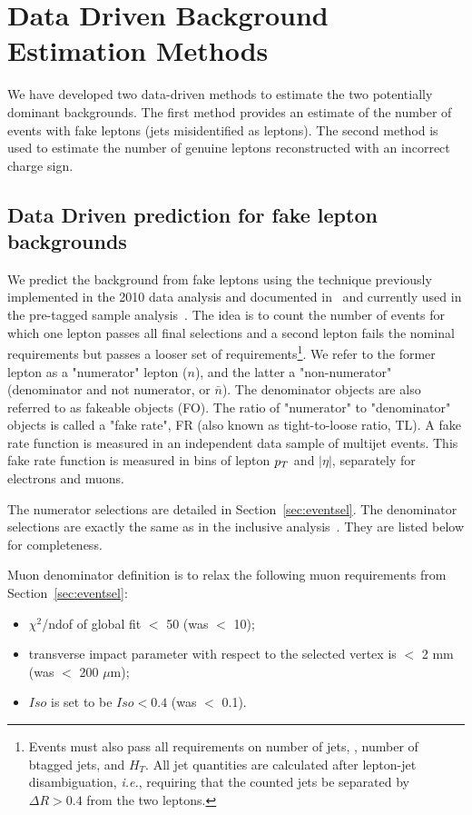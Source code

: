 \section{Data Driven Background Estimation Methods}
\label{sec:datadriven}

We have developed two data-driven methods to 
estimate the two potentially dominant backgrounds.
The first method provides an estimate of the number of events with fake leptons (jets misidentified as leptons).
The second method is used to estimate the number of genuine leptons reconstructed with an incorrect charge sign.

\subsection{Data Driven prediction for fake lepton backgrounds}
\label{sec:fakes}

We predict the background from fake leptons using the technique previously implemented in the 2010 data analysis
and documented in~\cite{frmethod} and currently used in the pre-tagged sample analysis~\cite{ssnote2011}.
The idea is to count the number of events for which one lepton passes all final selections and a second lepton
fails the nominal requirements but passes a looser set of requirements\footnote{Events must also
pass all requirements on number of jets, \met, number of btagged jets, and $H_T$.
All jet quantities are calculated after lepton-jet disambiguation, {\it i.e.}, requiring 
that the counted jets be separated by $\Delta R > 0.4$ from the two leptons.}. 
We refer to the former lepton as a "numerator" lepton ($n$),
and the latter a "non-numerator" (denominator and not numerator, or $\bar{n}$).
The denominator objects are also referred to as fakeable objects (FO).
The ratio of "numerator" to "denominator" objects is called a "fake rate",
 FR (also known as tight-to-loose ratio, TL).  
A fake rate function is measured in an independent data sample of multijet events.
This fake rate function is measured in bins of lepton $p_T$ and $|\eta |$,
separately for electrons and muons. 

The numerator selections are detailed in Section~\ref{sec:eventsel}. 
The denominator selections are exactly the same as in the inclusive analysis~\cite{ssnote2011}.
They are listed below for completeness.

Muon denominator definition is to relax the following muon requirements from
Section~\ref{sec:eventsel}:
\begin{itemize}
\item $\chi^2$/ndof of global fit $<$ 50 (was $<$ 10);
\item transverse impact parameter with respect to the selected vertex is
$<$ 2 mm (was $<$ 200 $\mu$m);
\item $Iso$ is set to be $Iso < 0.4$  (was $<$ 0.1).
\end{itemize}

